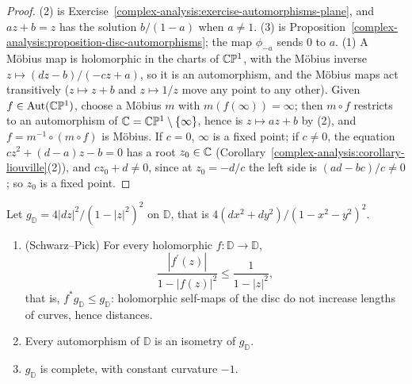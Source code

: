 \begin{proof}
(2) is Exercise~\ref{complex-analysis:exercise-automorphisms-plane}, and $az + b = z$ has the solution $b/(1 - a)$ when $a \neq 1$. (3) is
Proposition~\ref{complex-analysis:proposition-disc-automorphisms}; the map $\phi_{-a}$ sends $0$ to $a$. (1) A M\"obius map is holomorphic in the charts of $\mathbb{C}\mathbb{P}^1$, with the
M\"obius inverse $z \mapsto (dz - b)/(-cz + a)$, so it is an automorphism, and the M\"obius maps act transitively ($z \mapsto z + b$ and $z \mapsto 1/z$ move any point to any
other). Given $f \in \mathrm{Aut}(\mathbb{C}\mathbb{P}^1)$, choose a M\"obius $m$ with $m(f(\infty)) = \infty$; then $m \circ f$ restricts to an automorphism of $\mathbb{C} = \mathbb{C}\mathbb{P}^1 \setminus \{\infty\}$,
hence is $z \mapsto az + b$ by (2), and $f = m^{-1} \circ (m \circ f)$ is M\"obius. If $c = 0$, $\infty$ is a fixed point; if $c \neq 0$, the equation $cz^2 + (d - a)z - b = 0$ has a
root $z_0 \in \mathbb{C}$ (Corollary~\ref{complex-analysis:corollary-liouville}(2)), and $cz_0 + d \neq 0$, since at $z_0 = -d/c$ the left side is $(ad - bc)/c \neq 0$; so $z_0$ is a fixed point.
\end{proof}

\begin{proposition}\label{complex-manifolds:proposition-poincare-metric}
Let $g_{\mathbb{D}} = 4|dz|^2/(1 - |z|^2)^2$ on $\mathbb{D}$, that is $4(dx^2 + dy^2)/(1 - x^2 - y^2)^2$.
\begin{enumerate}
\item (Schwarz--Pick) For every holomorphic $f \colon \mathbb{D} \to \mathbb{D}$,
\[
\frac{|f^{\prime}(z)|}{1 - |f(z)|^2} \leq \frac1{1 - |z|^2},
\]
that is, $f^*g_{\mathbb{D}} \leq g_{\mathbb{D}}$: holomorphic self-maps of the disc do not increase lengths of curves, hence distances.
\item Every automorphism of $\mathbb{D}$ is an isometry of $g_{\mathbb{D}}$.
\item $g_{\mathbb{D}}$ is complete, with constant curvature $-1$.
\end{enumerate}
\end{proposition}

